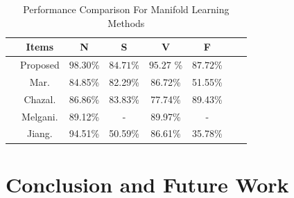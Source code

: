 \documentclass[journal]{IEEEtran}
\begin{document}
\begin{table}[!h]
\begin{center}
\begin{threeparttable}
\caption{Performance Comparison For Manifold Learning Methods}
\label{table1}
\begin{tabular}{cccccccc}
\hline
&  Items & N & S & V & F   \\
\hline

&Proposed &$\bm{98.30}$\% & $\bm{84.71}$\% & $\bm{95.27}$ \%& $\bm{87.72}$\%\\
& Mar. \cite{mar}  &84.85\% & 82.29\% & 86.72\% &51.55\%      \\


& Chazal. \cite{chaza} &86.86\% & 83.83\%  & 77.74\% & 89.43\%      \\

& Melgani.\cite{melgan}  &89.12\% & -  & 89.97\%  & -       \\

& Jiang.\cite{jiang}  & 94.51\% & 50.59\%  & 86.61\% & 35.78\%       \\

\hline
\end{tabular}
\end{threeparttable}
\end{center}
\end{table}
     



%
%

\section{Conclusion and Future Work}


\lipsum[1-4]



%
%
\end{document}
